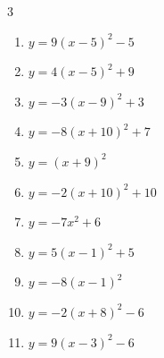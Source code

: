 \begin{multicols}{3}
\begin{enumerate}
  \item $\displaystyle y=9\left( x-5\right)^{2}-5$

        \phantom{$\displaystyle 頂点\left( 5 , -5 \right)$}

  \item $\displaystyle y=4\left( x-5\right)^{2}+9$

        \phantom{$\displaystyle 頂点\left( 5 , 9 \right)$}

  \item $\displaystyle y=-3\left( x-9\right)^{2}+3$

        \phantom{$\displaystyle 頂点\left( 9 , 3 \right)$}

  \item $\displaystyle y=-8\left( x+10\right)^{2}+7$

        \phantom{$\displaystyle 頂点\left( -10 , 7 \right)$}

  \item $\displaystyle y=\left( x+9\right)^{2}$

        \phantom{$\displaystyle 頂点\left( -9 , 0 \right)$}

  \item $\displaystyle y=-2\left( x+10\right)^{2}+10$

        \phantom{$\displaystyle 頂点\left( -10 , 10 \right)$}

\columnbreak %

  \item $\displaystyle y=-7x^{2}+6$

        \phantom{$\displaystyle 頂点\left( 0 , 6 \right)$}

  \item $\displaystyle y=5\left( x-1\right)^{2}+5$

        \phantom{$\displaystyle 頂点\left( 1 , 5 \right)$}

  \item $\displaystyle y=-8\left( x-1\right)^{2}$

        \phantom{$\displaystyle 頂点\left( 1 , 0 \right)$}

  \item $\displaystyle y=-2\left( x+8\right)^{2}-6$

        \phantom{$\displaystyle 頂点\left( -8 , -6 \right)$}

  \item $\displaystyle y=9\left( x-3\right)^{2}-6$

        \phantom{$\displaystyle 頂点\left( 3 , -6 \right)$}


\end{enumerate}
\end{multicols}
